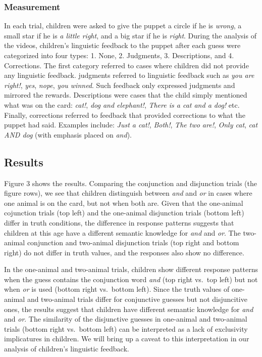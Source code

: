 \documentclass[10pt, letterpaper]{article}
\begin{document}
\subsubsection{Measurement}\label{measurement}

In each trial, children were asked to give the puppet a circle if he is
\emph{wrong}, a small star if he is \emph{a little right}, and a big
star if he is \emph{right}. During the analysis of the videos,
children's linguistic feedback to the puppet after each guess were
categorized into four types: 1. None, 2. Judgments, 3. Descriptions, and
4. Corrections. The first category referred to cases where children did
not provide any linguistic feedback. judgments referred to linguistic
feedback such as \emph{you are right!}, \emph{yes}, \emph{nope},
\emph{you winned}. Such feedback only expressed judgments and mirrored
the rewards. Descriptions were cases that the child simply mentioned
what was on the card: \emph{cat!}, \emph{dog and elephant!}, \emph{There
is a cat and a dog!} etc. Finally, corrections referred to feedback that
provided corrections to what the puppet had said. Examples include:
\emph{Just a cat!}, \emph{Both!}, \emph{The two are!}, \emph{Only cat},
\emph{cat AND dog} (with emphasis placed on \emph{and}).

\subsection{Results}\label{results-1}

Figure 3 shows the results. Comparing the conjunction and disjunction
trials (the figure rows), we see that children distinguish between
\emph{and} and \emph{or} in cases where one animal is on the card, but
not when both are. Given that the one-animal cojunction trials (top
left) and the one-animal disjunction trials (bottom left) differ in
truth conditions, the difference in response patterns suggests that
children at this age have a different semantic knowledge for \emph{and}
and \emph{or}. The two-animal conjunction and two-animal disjunction
trials (top right and bottom right) do not differ in truth values, and
the responses also show no difference.

In the one-animal and two-animal trials, children show different
response patterns when the guess contains the conjunction word
\emph{and} (top right vs.~top left) but not when \emph{or} is used
(bottom right vs.~bottom left). Since the truth values of one-animal and
two-animal trials differ for conjunctive guesses but not disjuncitive
ones, the results suggest that children have different semantic
knowledge for \emph{and} and \emph{or}. The similarity of the
disjunctive guesses in one-animal and two-animal trials (bottom right
vs.~bottom left) can be interpreted as a lack of exclusivity
implicatures in children. We will bring up a caveat to this
interpretation in our analysis of children's linguistic feedback.
\end{document}
